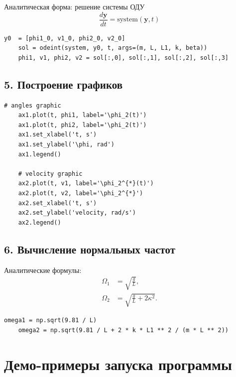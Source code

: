 \documentclass[a4paper,11pt]{article}
\theoremstyle{definition}
\begin{document}
Аналитическая форма: решение системы ОДУ
\begin{equation}
  \frac{d\mathbf{y}}{dt} = \mathrm{system}(\mathbf{y}, t)\label{eq:equation3}
\end{equation}

\begin{lstlisting}[language=MyPython,label={lst:lstlisting4}]
    y0  = [phi1_0, v1_0, phi2_0, v2_0]
    sol = odeint(system, y0, t, args=(m, L, L1, k, beta))
    phi1, v1, phi2, v2 = sol[:,0], sol[:,1], sol[:,2], sol[:,3]
\end{lstlisting}

\subsection*{5. Построение графиков}
\begin{lstlisting}[language=MyPython,label={lst:lstlisting5}]
    # angles graphic
    ax1.plot(t, phi1, label='\phi_2(t)')
    ax1.plot(t, phi2, label='\phi_2(t)')
    ax1.set_xlabel('t, s')
    ax1.set_ylabel('\phi, rad')
    ax1.legend()

    # velocity graphic
    ax2.plot(t, v1, label='\phi_2^{*}(t)')
    ax2.plot(t, v2, label='\phi_2^{*}')
    ax2.set_xlabel('t, s')
    ax2.set_ylabel('velocity, rad/s')
    ax2.legend()
\end{lstlisting}

\subsection*{6. Вычисление нормальных частот}

Аналитические формулы:
\begin{align*}
  \Omega_1 &= \sqrt{\frac{g}{L}}, \\
  \Omega_2 &= \sqrt{\frac{g}{L} + 2\kappa^2}.
\end{align*}

\begin{lstlisting}[language=MyPython,label={lst:lstlisting6}]
    omega1 = np.sqrt(9.81 / L)
    omega2 = np.sqrt(9.81 / L + 2 * k * L1 ** 2 / (m * L ** 2))
\end{lstlisting}

\section{Демо-примеры запуска программы}
\end{document}
